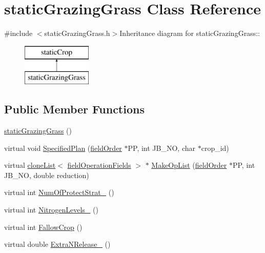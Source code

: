 \hypertarget{classstatic_grazing_grass}{
\section{staticGrazingGrass Class Reference}
\label{classstatic_grazing_grass}
}


{\ttfamily \#include $<$staticGrazingGrass.h$>$}Inheritance diagram for staticGrazingGrass::\begin{figure}[H]
\begin{center}
\leavevmode
\includegraphics[height=2cm]{classstatic_grazing_grass}
\end{center}
\end{figure}
\subsection*{Public Member Functions}
\begin{DoxyCompactItemize}
\item 
\hyperlink{classstatic_grazing_grass_a6f4b0bcad98d8c97048067cbf5d3a039}{staticGrazingGrass} ()
\item 
virtual void \hyperlink{classstatic_grazing_grass_ae3ecb060781dcf828d748bba9212e48b}{SpecifiedPlan} (\hyperlink{classfield_order}{fieldOrder} $\ast$PP, int JB\_\-NO, char $\ast$crop\_\-id)
\item 
virtual \hyperlink{classclone_list}{cloneList}$<$ \hyperlink{classfield_operation_fields}{fieldOperationFields} $>$ $\ast$ \hyperlink{classstatic_grazing_grass_ae65c2c9e795f4aa3c7d0f52703e4064a}{MakeOpList} (\hyperlink{classfield_order}{fieldOrder} $\ast$PP, int JB\_\-NO, double reduction)
\item 
virtual int \hyperlink{classstatic_grazing_grass_a07b29d7ed9e20b7ca1f2fbb82a851458}{NumOfProtectStrat\_\-} ()
\item 
virtual int \hyperlink{classstatic_grazing_grass_a0bb3e51f30d7b787e285f5a630a6ea47}{NitrogenLevels\_\-} ()
\item 
virtual int \hyperlink{classstatic_grazing_grass_ab33f2f00cf6f094fb387bef72443d5d4}{FallowCrop} ()
\item 
virtual double \hyperlink{classstatic_grazing_grass_adc616d1e28cd7c5257b7a80405d07abc}{ExtraNRelease\_\-} ()
\end{DoxyCompactItemize}


